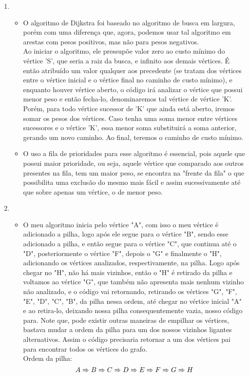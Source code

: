 \documentclass[11pt,reqno]{amsart}
\begin{document}
\begin{enumerate}
		\item

		\begin{itemize}
			\item O algoritmo de Dijkstra foi baseado no algoritmo de busca em largura, porém com uma diferença que, agora, podemos usar tal algoritmo em arestas com pesos positivos, mas não para pesos negativos. \\ Ao iniciar o algoritmo, ele pressupõe valor zero ao custo mínimo do vértice 'S', que seria a raiz da busca, e infinito aos demais vértices. É então atribuído um valor qualquer aos precedente (se tratam dos vértices entre o vértice inicial e o vértice final no caminho de custo mínimo), e enquanto houver vértice aberto, o código irá analizar o vértice que possui menor peso e então fecha-lo, denominaremos tal vértice  de vértice 'K'. Porém, para todo vértice sucessor de 'K' que ainda está aberto, iremos somar os pesos dos vértices. Caso tenha uma soma menor entre vértices sucessores e o vértice 'K', essa menor soma substituirá a soma anterior, gerando um novo caminho. Ao final, teremos o caminho de custo mínimo.
			\item  O uso a fila de prioridades para esse algoritmo é essencial, pois aquele que possui maior prioridade, ou seja, aquele vértice que comparado aos outros presentes na fila, tem um maior peso, se encontra na "frente da fila" o que possibilita uma exclusão do mesmo mais fácil e assim sucessivamente até que sobre apenas um vértice, o de menor peso.
		\end{itemize}
		\vspace{0.4cm}

		\item

		\begin{itemize}
			\item O meu algoritmo inicia pelo vértice "A", com isso o meu vértice é adicionado a pilha, logo após ele segue para o vértice "B", sendo esse adicionado a pilha, e então segue para o vértice "C", que continua até o "D", posteriormente o vértice "F", depois o "G" e finalmente o "H", adicionando os vértices analizados, respectivamente, na pilha. Logo após chegar no "H", não há mais vizinhos, então o "H" é retirado da pilha e voltamos ao vértice "G", que também não apresenta mais nenhum vizinho não analizado, e o código vai retornando, retirando os vértices "G", "F", "E", "D", "C", "B", da pilha nessa ordem, até chegar no vértice inicial "A" e ao retira-lo, deixando nossa pilha consequentemente vazia, nosso código para. Note que, pode existir outras maneiras de empilhar os vértices, bastava mudar a ordem da pilha para um dos nossos vizinhos ligantes alternativos. Assim o código precisaria retornar a um dos vértices pai para encontrar todos os vértices do grafo. \\ Ordem da pilha: \[ A \xRightarrow[ ]{ } B \xRightarrow[ ]{ } C \xRightarrow[ ]{ } D \xRightarrow[ ]{ } E \xRightarrow[ ]{ } F \xRightarrow[ ]{ } G \xRightarrow[ ]{ } H \]
		\end{itemize}
		\vspace{0.4cm}


\end{enumerate}
\end{document}
